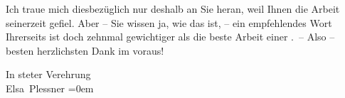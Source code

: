 \pstart
           {\pb}Ich traue mich diesbezüglich nur deshalb an Sie heran,
               weil Ihnen die Arbeit
               seinerzeit gefiel. Aber – Sie wissen ja, wie das ist, – ein empfehlendes Wort
               Ihrerseits ist doch zehnmal gewichtiger als die beste Arbeit einer \label{K_L03694-3v}\label{K_L03694-3}. – Also – besten herzlichsten Dank im voraus!\pend
           
\pstart
           In steter Verehrung{\\[\baselineskip]}\spacefill\mbox{Elsa Plessner}\pend
           \leftskip=0em{}\endnumbering{}  \newcommand{\dateiname}{L03694}\newcommand{\titel}{Elsa Plessner an Arthur Schnitzler, [Mitte April 1897]}\newcommand{\editorInnen}{Kurt Ifkovits, Selma Jahnke und Martin Anton Müller}
